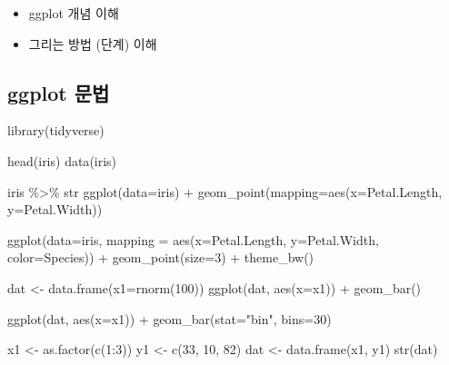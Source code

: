 \documentclass[
]{book}
\newenvironment{Shaded}{\begin{snugshade}}{\end{snugshade}}
\newcommand{\AttributeTok}[1]{\textcolor[rgb]{0.77,0.63,0.00}{#1}}
\newcommand{\DecValTok}[1]{\textcolor[rgb]{0.00,0.00,0.81}{#1}}
\newcommand{\FunctionTok}[1]{\textcolor[rgb]{0.00,0.00,0.00}{#1}}
\newcommand{\NormalTok}[1]{#1}
\newcommand{\OtherTok}[1]{\textcolor[rgb]{0.56,0.35,0.01}{#1}}
\newcommand{\SpecialCharTok}[1]{\textcolor[rgb]{0.00,0.00,0.00}{#1}}
\newcommand{\StringTok}[1]{\textcolor[rgb]{0.31,0.60,0.02}{#1}}
\providecommand{\tightlist}{%
  \setlength{\itemsep}{0pt}\setlength{\parskip}{0pt}}
\begin{document}
\begin{itemize}
\tightlist
\item
  ggplot 개념 이해
\item
  그리는 방법 (단계) 이해
\end{itemize}

\hypertarget{day2_class1_grammar}{%
\subsection{ggplot 문법}\label{day2_class1_grammar}}

\begin{Shaded}
\begin{Highlighting}[]
\FunctionTok{library}\NormalTok{(tidyverse)}

\FunctionTok{head}\NormalTok{(iris)}
\FunctionTok{data}\NormalTok{(iris)}

\NormalTok{iris }\SpecialCharTok{\%\textgreater{}\%}\NormalTok{ str}
\FunctionTok{ggplot}\NormalTok{(}\AttributeTok{data=}\NormalTok{iris) }\SpecialCharTok{+}
  \FunctionTok{geom\_point}\NormalTok{(}\AttributeTok{mapping=}\FunctionTok{aes}\NormalTok{(}\AttributeTok{x=}\NormalTok{Petal.Length, }\AttributeTok{y=}\NormalTok{Petal.Width))}


\FunctionTok{ggplot}\NormalTok{(}\AttributeTok{data=}\NormalTok{iris, }
       \AttributeTok{mapping =} \FunctionTok{aes}\NormalTok{(}\AttributeTok{x=}\NormalTok{Petal.Length, }
                     \AttributeTok{y=}\NormalTok{Petal.Width,}
                     \AttributeTok{color=}\NormalTok{Species)) }\SpecialCharTok{+}
  \FunctionTok{geom\_point}\NormalTok{(}\AttributeTok{size=}\DecValTok{3}\NormalTok{) }\SpecialCharTok{+}
  \FunctionTok{theme\_bw}\NormalTok{()}

\NormalTok{dat }\OtherTok{\textless{}{-}} \FunctionTok{data.frame}\NormalTok{(}\AttributeTok{x1=}\FunctionTok{rnorm}\NormalTok{(}\DecValTok{100}\NormalTok{))}
\FunctionTok{ggplot}\NormalTok{(dat, }\FunctionTok{aes}\NormalTok{(}\AttributeTok{x=}\NormalTok{x1)) }\SpecialCharTok{+}
  \FunctionTok{geom\_bar}\NormalTok{()}

\FunctionTok{ggplot}\NormalTok{(dat, }\FunctionTok{aes}\NormalTok{(}\AttributeTok{x=}\NormalTok{x1)) }\SpecialCharTok{+}
  \FunctionTok{geom\_bar}\NormalTok{(}\AttributeTok{stat=}\StringTok{"bin"}\NormalTok{, }\AttributeTok{bins=}\DecValTok{30}\NormalTok{)}



\NormalTok{x1 }\OtherTok{\textless{}{-}} \FunctionTok{as.factor}\NormalTok{(}\FunctionTok{c}\NormalTok{(}\DecValTok{1}\SpecialCharTok{:}\DecValTok{3}\NormalTok{))}
\NormalTok{y1 }\OtherTok{\textless{}{-}} \FunctionTok{c}\NormalTok{(}\DecValTok{33}\NormalTok{, }\DecValTok{10}\NormalTok{, }\DecValTok{82}\NormalTok{)}
\NormalTok{dat }\OtherTok{\textless{}{-}} \FunctionTok{data.frame}\NormalTok{(x1, y1)}
\FunctionTok{str}\NormalTok{(dat)}


\end{Highlighting}
\end{Shaded}
\end{document}
